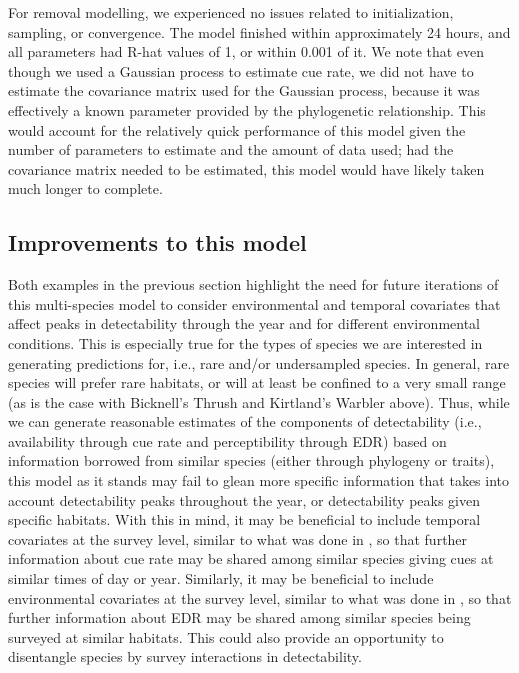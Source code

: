 \documentclass[12pt]{article}
\begin{document}
\par For removal modelling, we experienced no issues related to initialization, sampling, or convergence. 
The model finished within approximately 24 hours, and all parameters had R-hat values of 1, or within 0.001 of it.
We note that even though we used a Gaussian process to estimate cue rate, we did not have to estimate the covariance matrix used for the Gaussian process, because it was effectively a known parameter provided by the phylogenetic relationship.
This would account for the relatively quick performance of this model given the number of parameters to estimate and the amount of data used; had the covariance matrix needed to be estimated, this model would have likely taken much longer to complete.

\subsection{Improvements to this model}

Both examples in the previous section highlight the need for future iterations of this multi-species model to consider environmental and temporal covariates that affect peaks in detectability through the year and for different environmental conditions. 
This is especially true for the types of species we are interested in generating predictions for, i.e., rare and/or undersampled species.
In general, rare species will prefer rare habitats, or will at least be confined to a very small range (as is the case with Bicknell’s Thrush and Kirtland’s Warbler above). 
Thus, while we can generate reasonable estimates of the components of detectability (i.e., availability through cue rate and perceptibility through EDR) based on information borrowed from similar species (either through phylogeny or traits), this model as it stands may fail to glean more specific information that takes into account detectability peaks throughout the year, or detectability peaks given specific habitats. 
With this in mind, it may be beneficial to include temporal covariates at the survey level, similar to what was done in \citet{solymos_calibrating_2013, solymos_evaluating_2018, edwards_point_2023}, so that further information about cue rate may be shared among similar species giving cues at similar times of day or year.
Similarly, it may be beneficial to include environmental covariates at the survey level, similar to what was done in \citet{solymos_calibrating_2013, edwards_point_2023}, so that further information about EDR may be shared among similar species being surveyed at similar habitats.
This could also provide an opportunity to disentangle species by survey interactions in detectability.
\end{document}
